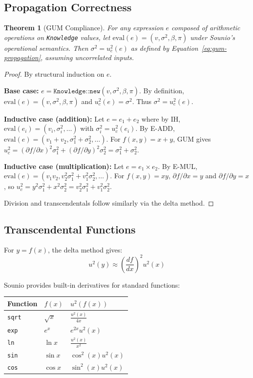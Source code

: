 \documentclass[11pt,a4paper]{article}
\newtheorem{theorem}{Theorem}
\begin{document}
\subsection{Propagation Correctness}

\begin{theorem}[GUM Compliance]
\label{thm:gum-compliance}
For any expression $e$ composed of arithmetic operations on \texttt{Knowledge}
values, let $\text{eval}(e) = (v, \sigma^2, \beta, \pi)$ under Sounio's
operational semantics. Then $\sigma^2 = u_c^2(e)$ as defined by
Equation~\ref{eq:gum-propagation}, assuming uncorrelated inputs.
\end{theorem}

\begin{proof}
By structural induction on $e$.

\textbf{Base case:} $e = \texttt{Knowledge::new}(v, \sigma^2, \beta, \pi)$.
By definition, $\text{eval}(e) = (v, \sigma^2, \beta, \pi)$ and
$u_c^2(e) = \sigma^2$. Thus $\sigma^2 = u_c^2(e)$.

\textbf{Inductive case (addition):} Let $e = e_1 + e_2$ where by IH,
$\text{eval}(e_i) = (v_i, \sigma_i^2, \ldots)$ with $\sigma_i^2 = u_c^2(e_i)$.
By E-ADD, $\text{eval}(e) = (v_1{+}v_2, \sigma_1^2{+}\sigma_2^2, \ldots)$.
For $f(x,y) = x+y$, GUM gives $u_c^2 = (\partial f/\partial x)^2 \sigma_1^2 +
(\partial f/\partial y)^2 \sigma_2^2 = \sigma_1^2 + \sigma_2^2$. \checkmark

\textbf{Inductive case (multiplication):} Let $e = e_1 \times e_2$.
By E-MUL, $\text{eval}(e) = (v_1 v_2, v_2^2\sigma_1^2 + v_1^2\sigma_2^2, \ldots)$.
For $f(x,y) = xy$, $\partial f/\partial x = y$ and $\partial f/\partial y = x$,
so $u_c^2 = y^2\sigma_1^2 + x^2\sigma_2^2 = v_2^2\sigma_1^2 + v_1^2\sigma_2^2$. \checkmark

Division and transcendentals follow similarly via the delta method.
\end{proof}

\subsection{Transcendental Functions}

For $y = f(x)$, the delta method gives:
\[
  u^2(y) \approx \left(\frac{df}{dx}\right)^2 u^2(x)
\]

Sounio provides built-in derivatives for standard functions:

\begin{center}
\begin{tabular}{lll}
\toprule
Function & $f(x)$ & $u^2(f(x))$ \\
\midrule
\texttt{sqrt} & $\sqrt{x}$ & $\frac{u^2(x)}{4x}$ \\
\texttt{exp} & $e^x$ & $e^{2x} u^2(x)$ \\
\texttt{ln} & $\ln x$ & $\frac{u^2(x)}{x^2}$ \\
\texttt{sin} & $\sin x$ & $\cos^2(x) u^2(x)$ \\
\texttt{cos} & $\cos x$ & $\sin^2(x) u^2(x)$ \\
\bottomrule
\end{tabular}
\end{center}
\end{document}
